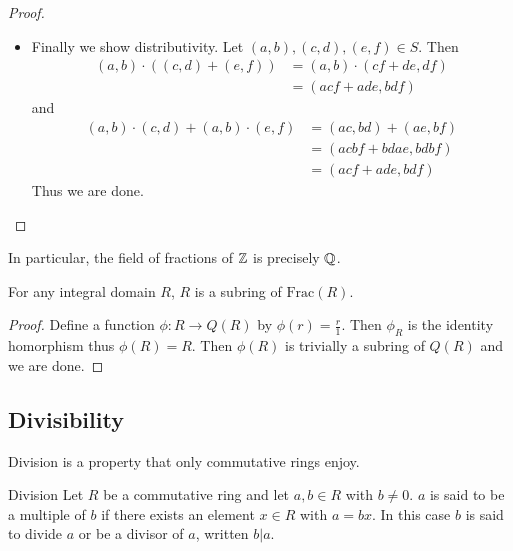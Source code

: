 \documentclass[a4paper]{article}
\begin{document}
\begin{prp}{}{}
\begin{proof}
\begin{itemize}
\item Finally we show distributivity. Let $(a,b),(c,d),(e,f)\in S$. Then 
\begin{align*}
(a,b)\cdot((c,d)+(e,f))&=(a,b)\cdot(cf+de,df)\\
&=(acf+ade,bdf)
\end{align*}
and 
\begin{align*}
(a,b)\cdot(c,d)+(a,b)\cdot(e,f)&=(ac,bd)+(ae,bf)\\
&=(acbf+bdae,bdbf)\\
&=(acf+ade,bdf)\tag{equivalence relation}
\end{align*}
Thus we are done. 
\end{itemize}
\end{proof}
\end{prp}

In particular, the field of fractions of $\mathbb{Z}$ is precisely $\mathbb{Q}$. 

\begin{lmm}{}{} For any integral domain $R$, $R$ is a subring of $\text{Frac}(R)$. \tcbline
\begin{proof}
Define a function $\phi:R\to Q(R)$ by $\phi(r)=\frac{r}{1}$. Then $\phi_R$ is the identity homorphism thus $\phi(R)=R$. Then $\phi(R)$ is trivially a subring of $Q(R)$ and we are done. 
\end{proof}
\end{lmm}

\subsection{Divisibility}
Division is a property that only commutative rings enjoy. 

\begin{defn}{Division}{} Let $R$ be a commutative ring and let $a,b\in R$ with $b\neq 0$. $a$ is said to be a multiple of $b$ if there exists an element $x\in R$ with $a=bx$. In this case $b$ is said to divide $a$ or be a divisor of $a$, written $b|a$. 
\end{defn}
\end{document}
